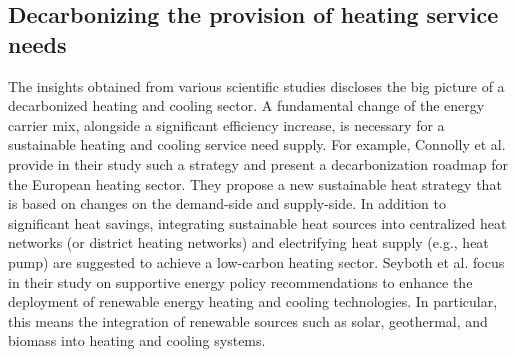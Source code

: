 \subsection{Decarbonizing the provision of heating service needs}\label{aspect1}
The insights obtained from various scientific studies discloses the big picture of a decarbonized heating and cooling sector. A fundamental change of the energy carrier mix, alongside a significant efficiency increase, is necessary for a sustainable heating and cooling service need supply. For example, Connolly et al. \cite{connolly2014heat} provide in their study such a strategy and present a decarbonization roadmap for the European heating sector. They propose a new sustainable heat strategy that is based on changes on the demand-side and supply-side. In addition to significant heat savings, integrating sustainable heat sources into centralized heat networks (or district heating networks) and electrifying heat supply (e.g., heat pump) are suggested to achieve a low-carbon heating sector. Seyboth et al. \cite{seyboth2008recognising} focus in their study on supportive energy policy recommendations to enhance the deployment of renewable energy heating and cooling technologies. In particular, this means the integration of renewable sources such as solar, geothermal, and biomass into heating and cooling systems.\vspace{0.5cm}

